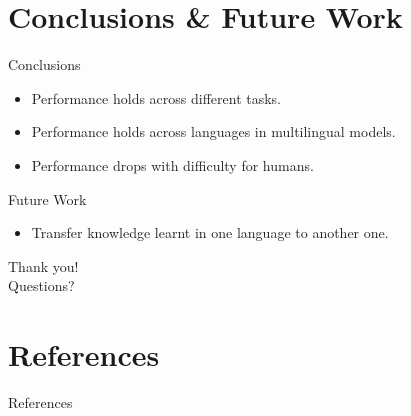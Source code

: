 \documentclass[]{beamer}
\begin{document}
\section{Conclusions \& Future Work}
  \begin{frame}{\secname}
    \begin{alertblock}{Conclusions}
      \begin{itemize}
        \item Performance holds across different tasks.
        \item Performance holds across languages in multilingual models.
        \item Performance drops with difficulty for humans.
      \end{itemize}
    \end{alertblock}
    \begin{alertblock}{Future Work}
      \begin{itemize}
        \item Transfer knowledge learnt in one language to another one.
      \end{itemize}
    \end{alertblock}
  \end{frame}


\begin{frame}[standout]
  Thank you!\\
  Questions?
\end{frame}

\section{References}
  \begin{frame}[allowframebreaks]{References}
    \printbibliography%
  \end{frame}
\end{document}
